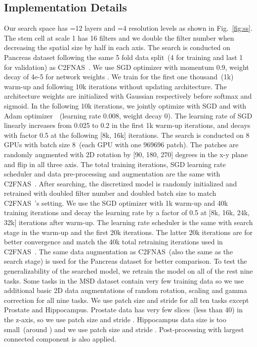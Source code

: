 \documentclass[final]{cvpr}
\begin{document}
\subsection{Implementation Details}
\label{s:imp}
Our search space has =12 layers and =4 resolution levels as shown in Fig.~\ref{fig:ss}. The stem cell at scale 1 has 16 filters and we double the filter number when decreasing the spatial size by half in each axis. The search is conducted on Pancreas dataset following the same 5 fold data split~(4 for training and last 1 for validation) as C2FNAS~\cite{yu2020c2fnas}. We use SGD optimizer with momentum 0.9, weight decay of 4e-5 for network weights . We train  for the first one thousand~(1k) warm-up and following 10k iterations without updating architecture. The architecture weights  are initialized with Gaussian  respectively before softmax and sigmoid. In the following 10k iterations, we jointly optimize  with SGD and  with Adam optimizer~\cite{kingma2014adam}~(learning rate 0.008, weight decay 0). The learning rate of SGD linearly increases from 0.025 to 0.2 in the first 1k warm-up iterations, and decays with factor 0.5 at the following [8k, 16k] iterations. The search is conducted on 8 GPUs with batch size 8~(each GPU with one 969696 patch). The patches are randomly augmented with 2D rotation by [90, 180, 270] degrees in the x-y plane and flip in all three axis. The total training iterations, SGD learning rate scheduler and data pre-processing and augmentation are the same with C2FNAS~\cite{yu2020c2fnas}.  After searching, the discretized model is randomly initialized and retrained with doubled filter number and doubled batch size to match C2FNAS~\cite{yu2020c2fnas}'s setting. We use the SGD optimizer with 1k warm-up and 40k training iterations and decay the learning rate by a factor of 0.5 at [8k, 16k, 24k, 32k] iterations after warm-up. The learning rate scheduler is the same with search stage in the warm-up and the first 20k iterations. The latter 20k iterations are for better convergence and match the 40k total retraining iterations used in C2FNAS~\cite{yu2020c2fnas}. The same data augmentation as C2FNAS~(also the same as the search stage) is used for the Pancreas dataset for better comparison. To test the generalizability of the searched model, we retrain the model on all of the rest nine tasks. Some tasks in the MSD dataset contain very few training data so we use additional basic 2D data augmentations of random rotation, scaling and gamma correction for all nine tasks. We use patch size  and stride  for all ten tasks except Prostate and Hippocampus. Prostate data has very few slices~(less than 40) in the z-axis, so we use patch size  and stride . Hippocampus data size is too small~(around ) and we use patch size  and stride . Post-processing with largest connected component is also applied.
\end{document}
